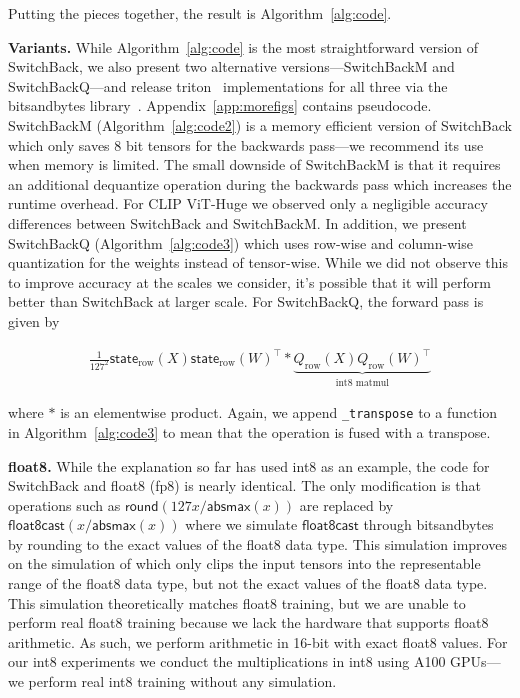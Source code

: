 Putting the pieces together, the result is Algorithm~\ref{alg:code}.

\textbf{Variants.} While Algorithm~\ref{alg:code} is the most straightforward version of SwitchBack, we also present two alternative versions---SwitchBackM and SwitchBackQ---and release triton~\cite{tillet2019triton} implementations for all three via the bitsandbytes library~\cite{dettmers2022optimizers}.
Appendix~\ref{app:morefigs} contains pseudocode. SwitchBackM (Algorithm~\ref{alg:code2}) is a memory efficient version of SwitchBack which only saves 8 bit tensors for the backwards pass---we recommend its use when memory is limited. The small downside of SwitchBackM is that it requires an additional dequantize operation during the backwards pass which increases the runtime overhead. For CLIP ViT-Huge we observed only a negligible accuracy differences between SwitchBack and SwitchBackM. In addition, we present SwitchBackQ (Algorithm~\ref{alg:code3}) which uses row-wise and column-wise quantization for the weights instead of tensor-wise. While we did not observe this to improve accuracy at the scales we consider, it's possible that it will perform better than SwitchBack at larger scale. For SwitchBackQ, the forward pass is given by

\begin{align}
    \frac{1}{127^2}  \mathsf{state}_\text{row}(X)\mathsf{state}_\text{row}(W)^\top * \underbrace{Q_\text{row}\left(X\right) Q_\text{row}\left(W\right)^\top}_{\text{int8 matmul}} 
\end{align}

where $*$ is an elementwise product. Again, we append \texttt{\_transpose} to a function in Algorithm~\ref{alg:code3} to mean that the operation is fused with a transpose. 

\textbf{float8.} While the explanation so far has used int8 as an example, the code for SwitchBack and float8 (fp8) is nearly identical. The only modification is that operations such as $\mathsf{round}(127 x / \mathsf{absmax}(x))$ are replaced by $\mathsf{float8cast}(x / \mathsf{absmax}(x))$ where we simulate $\mathsf{float8cast}$ through bitsandbytes by rounding to the exact values of the float8 data type. This simulation improves on the simulation of \citep{micikevicius2022fp8} which only clips the input tensors into the representable range of the float8 data type, but not the exact values of the float8 data type. This simulation theoretically matches float8 training, but we are unable to perform real float8 training because we lack the hardware that supports float8 arithmetic. As such, we perform arithmetic in 16-bit with exact float8 values. For our int8 experiments we conduct the multiplications in int8 using A100 GPUs---we perform real int8 training without any simulation.

